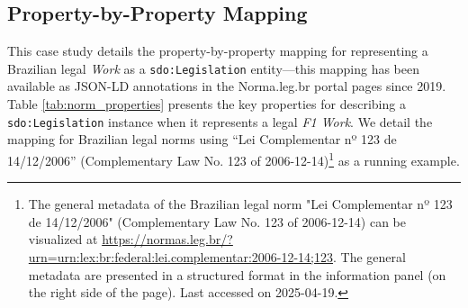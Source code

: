 \documentclass[11pt]{article}
\begin{document}
\subsection{Property-by-Property Mapping}
\label{sec:properties_mapping}

This case study details the property-by-property mapping for representing a Brazilian legal \textit{Work} as a \texttt{sdo:Legislation} entity---this mapping has been available as JSON-LD annotations in the Norma.leg.br portal pages since 2019. Table \ref{tab:norm_properties} presents the key properties for describing a \texttt{sdo:Legislation} instance when it represents a legal \emph{F1 Work}. We detail the mapping for Brazilian legal norms using “Lei Complementar nº 123 de 14/12/2006” (Complementary Law No. 123 of 2006-12-14)\footnote{The general metadata of the Brazilian legal norm "Lei Complementar nº 123 de 14/12/2006" (Complementary Law No. 123 of 2006-12-14) can be visualized at \url{https://normas.leg.br/?urn=urn:lex:br:federal:lei.complementar:2006-12-14;123}. The general metadata are presented in a structured format in the information panel (on the right side of the page). Last accessed on 2025-04-19.} as a running example.
\end{document}
